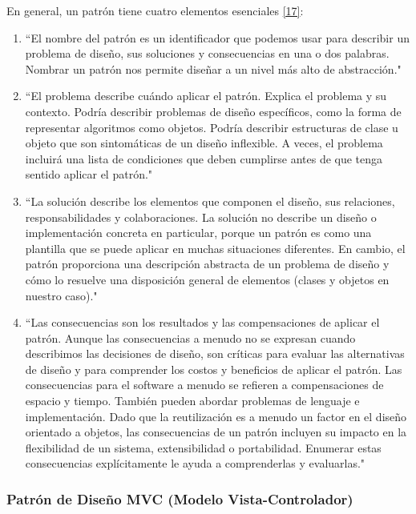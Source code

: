 En general, un patrón tiene cuatro elementos esenciales \hyperlink{b17}{[17]}:

\begin{enumerate}
	\item ``El nombre del patrón es un identificador que podemos usar para describir un problema de diseño, sus soluciones y consecuencias en una o dos palabras. Nombrar un patrón nos permite diseñar a un nivel más alto de abstracción."
	
	\item ``El problema describe cuándo aplicar el patrón. Explica el problema y su contexto. Podría describir problemas de diseño específicos, como la forma de representar algoritmos como objetos. Podría describir estructuras de clase u objeto que son sintomáticas de un diseño inflexible. A veces, el problema incluirá una lista de condiciones que deben cumplirse antes de que tenga sentido aplicar el patrón."
	
	\item ``La solución describe los elementos que componen el diseño, sus relaciones, responsabilidades y colaboraciones. La solución no describe un diseño o implementación concreta en particular, porque un patrón es como una plantilla que se puede aplicar en muchas situaciones diferentes. En cambio, el patrón proporciona una descripción abstracta de un problema de diseño y cómo lo resuelve una disposición general de elementos (clases y objetos en nuestro caso)."
	
	\item ``Las consecuencias son los resultados y las compensaciones de aplicar el patrón. Aunque las consecuencias a menudo no se expresan cuando describimos las decisiones de diseño, son críticas para evaluar las alternativas de diseño y para comprender los costos y beneficios de aplicar el patrón. Las consecuencias para el software a menudo se refieren a compensaciones de espacio y tiempo. También pueden abordar problemas de lenguaje e implementación. Dado que la reutilización es a menudo un factor en el diseño orientado a objetos, las consecuencias de un patrón incluyen su impacto en la flexibilidad de un sistema, extensibilidad o portabilidad. Enumerar estas consecuencias explícitamente le ayuda a comprenderlas y evaluarlas."
\end{enumerate}

\subsubsection{Patrón de Diseño MVC (Modelo Vista-Controlador)}

